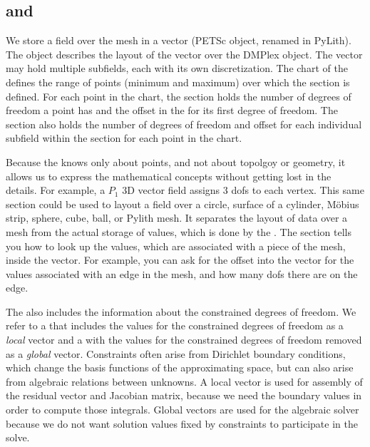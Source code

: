 \subsection{ and }
\label{sec:developer:petsc:section}

We store a field over the mesh in a vector (PETSc  object,
renamed  in PyLith). The  object
describes the layout of the vector over the DMPlex object. The vector
may hold multiple subfields, each with its own discretization. The
chart of the  defines the range of points
(minimum and maximum) over which the section is defined. For each
point in the chart, the section holds the number of degrees of freedom
a point has and the offset in the  for its first
degree of freedom. The section also holds the number of
degrees of freedom and offset for each individual subfield within the
section for each point in the chart.

Because the  knows only about points, and not
about topolgoy or geometry, it allows us to express the mathematical
concepts without getting lost in the details. For example, a $P_1$ 3D
vector field assigns 3 dofs to each vertex. This same section could be
used to layout a field over a circle, surface of a cylinder, M\"obius
strip, sphere, cube, ball, or Pylith mesh. It separates the layout of
data over a mesh from the actual storage of values, which is done by
the . The section tells you how to look up the
values, which are associated with a piece of the mesh, inside the
vector. For example, you can ask for the offset into the vector for
the values associated with an edge in the mesh, and how many dofs
there are on the edge.

The  also includes the information about the
constrained degrees of freedom. We refer to a  that
includes the values for the constrained degrees of freedom as a {\em
  local} vector and a  with the values for the
constrained degrees of freedom removed as a {\em global}
vector. Constraints often arise from Dirichlet boundary conditions,
which change the basis functions of the approximating space, but can
also arise from algebraic relations between unknowns. A local vector
is used for assembly of the residual vector and Jacobian matrix,
because we need the boundary values in order to compute those
integrals. Global vectors are used for the algebraic solver because we
do not want solution values fixed by constraints to participate in the
solve.

